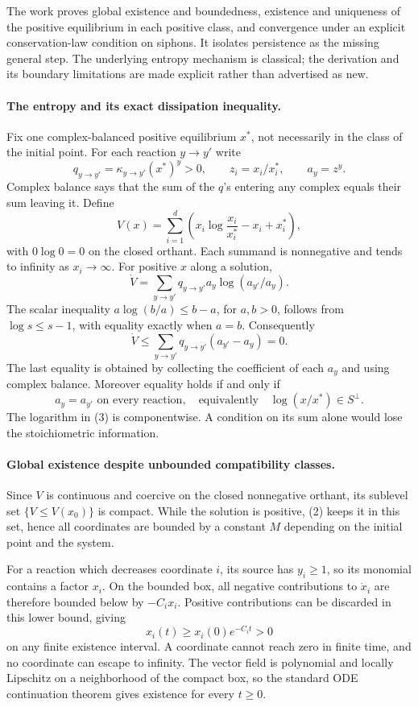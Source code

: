 \documentclass[11pt]{article}
\begin{document}
The work proves global existence and boundedness, existence and
uniqueness of the positive equilibrium in each positive class, and
convergence under an explicit conservation-law condition on siphons.
It isolates persistence as the missing general step. The underlying
entropy mechanism is classical; the derivation and its boundary
limitations are made explicit rather than advertised as new.

\paragraph{The entropy and its exact dissipation inequality.}
Fix one complex-balanced positive equilibrium $x^*$, not necessarily
in the class of the initial point. For each reaction $y\to y'$ write
\[
 q_{y\to y'}=\kappa_{y\to y'}(x^*)^y>0,
 \qquad z_i=x_i/x_i^*,\qquad a_y=z^y.
\]
Complex balance says that the sum of the $q$'s entering any complex
equals their sum leaving it. Define
\[
 V(x)=\sum_{i=1}^d\left(x_i\log\frac{x_i}{x_i^*}-x_i+x_i^*\right),
                                                               \tag{1}
\]
with $0\log0=0$ on the closed orthant. Each summand is nonnegative
and tends to infinity as $x_i\to\infty$.
For positive $x$ along a solution,
\[
 \dot V=\sum_{y\to y'}q_{y\to y'}a_y\log(a_{y'}/a_y).
\]
The scalar inequality $a\log(b/a)\le b-a$, for $a,b>0$, follows
from $\log s\le s-1$, with equality exactly when $a=b$.
Consequently
\[
 \dot V\le\sum_{y\to y'}q_{y\to y'}(a_{y'}-a_y)=0.      \tag{2}
\]
The last equality is obtained by collecting the coefficient of each
$a_y$ and using complex balance. Moreover equality holds if and only if
\[
       a_y=a_{y'}\text{ on every reaction},
       \quad\text{equivalently}\quad \log(x/x^*)\in S^\perp.
                                                               \tag{3}
\]
The logarithm in (3) is componentwise. A condition on its sum alone
would lose the stoichiometric information.

\paragraph{Global existence despite unbounded compatibility classes.}
Since $V$ is continuous and coercive on the closed nonnegative orthant,
its sublevel set $\{V\le V(x_0)\}$ is compact. While the solution is
positive, (2) keeps it in this set, hence all coordinates are bounded
by a constant $M$ depending on the initial point and the system.

For a reaction which decreases coordinate $i$, its source has $y_i\ge1$,
so its monomial contains a factor $x_i$. On the bounded box,
all negative contributions to $\dot x_i$ are therefore bounded below
by $-C_i x_i$. Positive contributions can be discarded in this lower
bound, giving
\[
                       x_i(t)\ge x_i(0)e^{-C_it}>0        \tag{4}
\]
on any finite existence interval. A coordinate cannot reach zero in
finite time, and no coordinate can escape to infinity. The vector
field is polynomial and locally Lipschitz on a neighborhood of the
compact box, so the standard ODE continuation theorem gives existence
for every $t\ge0$.
\end{document}
